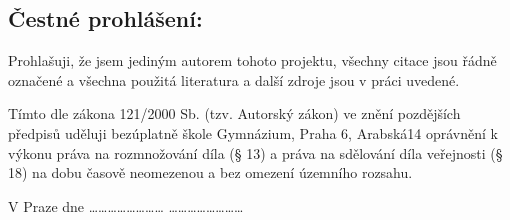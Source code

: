 \clearpageenabledfalse %
\newpage


\mbox{}
\vfill
\begin{Large}
\section*{Čestné prohlášení:}
\end{Large}
\par Prohlašuji, že jsem jediným autorem tohoto projektu, všechny citace jsou řádně označené a všechna použitá literatura a další zdroje jsou v práci uvedené. 
\par Tímto dle zákona 121/2000 Sb. (tzv. Autorský zákon) ve znění pozdějších předpisů uděluji bezúplatně škole Gymnázium, Praha 6, Arabská14 oprávnění k výkonu práva na rozmnožování díla (§ 13) a práva na sdělování díla veřejnosti (§ 18) na dobu časově neomezenou a bez omezení územního rozsahu.

\vspace{40pt}
\noindent
V Praze dne …………………… \hspace{20pt} …………………… \\


\clearpageenabledtrue %